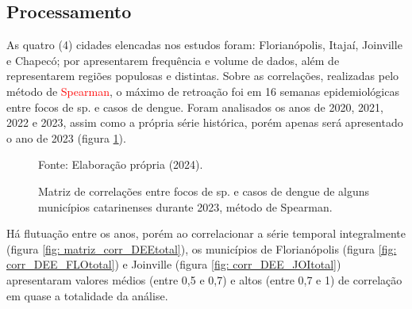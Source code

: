 \documentclass[
	12pt,				%
	openright,			%
	oneside,			%
	a4paper,			%
	english,			%
	french,				%
	spanish,			%
	brazil				%
	dvipsnames, table]{abntex2}
\begin{document}
\subsection{Processamento}

\indent As quatro (4) cidades elencadas nos estudos foram: Florianópolis, Itajaí, Joinville e Chapecó; por apresentarem frequência e volume de dados, além de representarem regiões populosas e distintas. Sobre as correlações, realizadas pelo método de \textcolor{red}{Spearman}, o máximo de retroação foi em 16 semanas epidemiológicas entre focos de  sp. e casos de dengue. Foram analisados os anos de 2020, 2021, 2022 e 2023, assim como a própria série histórica, porém apenas será apresentado o ano de 2023 (figura \ref{fig: matriz_corr_DEE}).

\begin{figure}[htbp]
    \centering
    \caption{Matriz de correlações entre focos de  sp. e casos de dengue de alguns municípios catarinenses durante 2023, método de Spearman.}
    \label{fig: matriz_corr_DEE}
    \hfill
    \hfill
    \small{Fonte: Elaboração própria (2024).}
\end{figure}

Há flutuação entre os anos, porém ao correlacionar a série temporal integralmente (figura \ref{fig: matriz_corr_DEEtotal}), os municípios de Florianópolis (figura \ref{fig: corr_DEE_FLOtotal}) e Joinville (figura \ref{fig: corr_DEE_JOItotal}) apresentaram valores médios (entre 0,5 e 0,7) e altos (entre 0,7 e 1) de correlação em quase a totalidade da análise.

\end{document}
